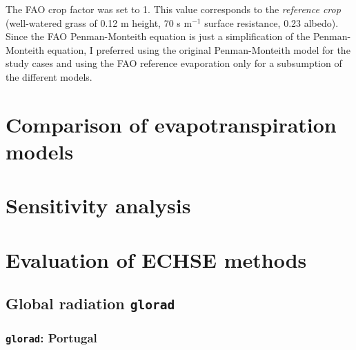 \documentclass{scrreprt}
\begin{document}
The FAO crop factor was set to 1.
This value corresponds to the \emph{reference crop} (well-watered grass of 0.12 m height, 70 s m$^{-1}$ surface resistance, 0.23 albedo).
Since the FAO Penman-Monteith equation is just a simplification of the Penman-Monteith equation, I preferred using the original Penman-Monteith model for the study cases and using the FAO reference evaporation only for a subsumption of the different models.


\chapter{Comparison of evapotranspiration models} \label{ch:modelcomp}


\chapter{Sensitivity analysis} \label{ch:sensana}


\chapter{Evaluation of ECHSE methods} \label{ch:methodcomp}

\section{Global radiation \texttt{glorad}}

\subsection{\texttt{glorad}: Portugal}
\end{document}
